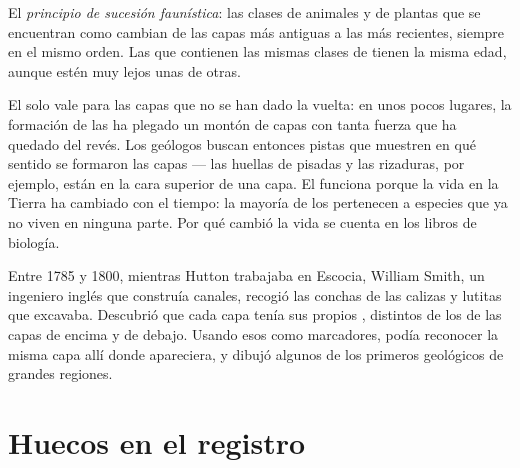 \begin{definition}\label{def:g7:geological-time:fossil-succession}
El \emph{principio de sucesión faunística}: las clases de animales y de plantas que se encuentran como  cambian
de las capas más antiguas a las más recientes, siempre en el mismo orden.
Las  que contienen las mismas clases de  tienen la misma edad,
aunque estén muy lejos unas de otras.
\end{definition}


El  solo vale para las capas que no se han dado
la vuelta: en unos pocos lugares, la formación de las  ha plegado
un montón de capas con tanta fuerza que ha quedado del revés. Los geólogos
buscan entonces pistas que muestren en qué sentido se formaron las capas
--- las huellas de pisadas y las rizaduras, por ejemplo, están en la cara
superior de una capa. El  funciona porque
la vida en la Tierra ha cambiado con el tiempo: la mayoría de los 
pertenecen a especies que ya no viven en ninguna parte. Por qué cambió la
vida se cuenta en los libros de biología.

\begin{history}
Entre 1785 y 1800, mientras Hutton trabajaba en Escocia, William Smith, un
ingeniero inglés que construía canales, recogió las conchas  de las
calizas y lutitas que excavaba. Descubrió que cada capa tenía sus propios
, distintos de los de las capas de encima y de debajo. Usando esos
 como marcadores, podía reconocer la misma capa allí donde
apareciera, y dibujó algunos de los primeros  geológicos de grandes
regiones.
\end{history}

\section{Huecos en el registro}

